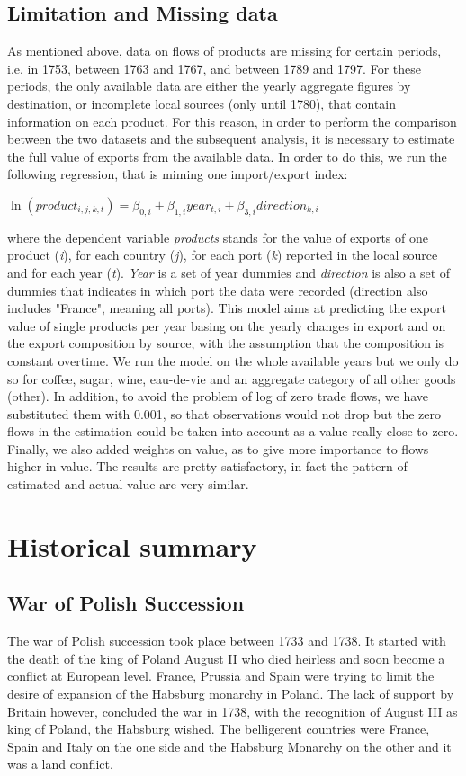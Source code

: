 \documentclass[12pt,a4paper,notitlepage,english]{article}
\begin{document}
\subsection{Limitation and Missing data} \label{limitations}
As mentioned above, data on flows of products are missing for certain periods, i.e. in 1753, between 1763 and 1767, and between 1789 and 1797. 
For these periods, the only available data are either the yearly aggregate figures by destination, or incomplete local sources (only until 1780), that contain information on each product. For this reason, in order to perform the comparison between the two datasets and the subsequent analysis, it is necessary to estimate the full value of exports from the available data. In order to do this, we run the following regression, that is miming one import/export index:
\begin{center}
$\ln(product_{i,j,k,t})=\beta_{0,i} + \beta_{1,i}year_{t,i}+\beta_{3,i}direction_{k,i}$
\end{center}
where the dependent variable \textit{products} stands for the value of exports of one product (\textit{i}), for each country (\textit{j}), for each port (\textit{k}) reported in the local source and for each year (\textit{t}). \textit{Year} is a set of year dummies and \textit{direction} is also a set of dummies that indicates in which port the data were recorded (direction also includes "France", meaning all ports). This model aims at predicting the export value of single products per year basing on the yearly changes in export and on the export composition by source, with the assumption that the composition is constant overtime. We run the model on the whole available years but we only do so for coffee, sugar, wine, eau-de-vie and an aggregate category of all other goods (other). In addition, to avoid the problem of log of zero trade flows, we have substituted them with 0.001, so that observations would not drop but the zero flows in the estimation could be taken into account as a value really close to zero. Finally, we also added weights on value, as to give more importance to flows higher in value. The results are pretty satisfactory, in fact the pattern of estimated and actual value are very similar. 

\section{Historical summary} \label{historical_summary}
\subsection{War of Polish Succession}
The war of Polish succession took place between 1733 and 1738. It started with the death of the king of Poland August II who died heirless and soon become a conflict at European level. France, Prussia and Spain were trying to limit the desire of expansion of the Habsburg monarchy in Poland. The lack of support by Britain however, concluded the war in 1738, with the recognition of August III as king of Poland, the Habsburg wished. The belligerent countries were France, Spain and Italy on the one side and the Habsburg Monarchy on the other and it was a land conflict. 
\end{document}
